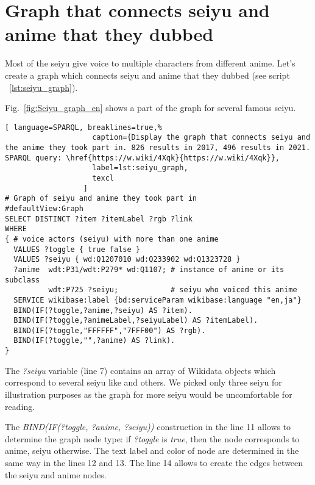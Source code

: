 \section{Graph that connects seiyu and anime that they dubbed}

Most of the seiyu give voice to multiple characters from different anime. Let's create a graph which connects seiyu and anime that they dubbed (see script ~\ref{lst:seiyu_graph}).

Fig.~\ref{fig:Seiyu_graph_en} shows a part of the graph for several famous seiyu.

\begin{widepar}%
\captionsetup[lstlisting]{format=llapwide18}%
%
\begin{lstlisting}[ language=SPARQL, breaklines=true,%
                    caption={Display the graph that connects seiyu and the anime they took part in. 826 results in 2017, 496 results in 2021. SPARQL query: \href{https://w.wiki/4Xqk}{https://w.wiki/4Xqk}},
                    label=lst:seiyu_graph,
                    texcl
                  ]
# Graph of seiyu and anime they took part in
#defaultView:Graph
SELECT DISTINCT ?item ?itemLabel ?rgb ?link
WHERE
{ # voice actors (seiyu) with more than one anime
  VALUES ?toggle { true false }
  VALUES ?seiyu { wd:Q1207010 wd:Q233902 wd:Q1323728 }
  ?anime  wdt:P31/wdt:P279* wd:Q1107; # instance of anime or its subclass
          wdt:P725 ?seiyu;            # seiyu who voiced this anime 
  SERVICE wikibase:label {bd:serviceParam wikibase:language "en,ja"}
  BIND(IF(?toggle,?anime,?seiyu) AS ?item).
  BIND(IF(?toggle,?animeLabel,?seiyuLabel) AS ?itemLabel).
  BIND(IF(?toggle,"FFFFFF","7FFF00") AS ?rgb).
  BIND(IF(?toggle,"",?anime) AS ?link).
}
\end{lstlisting}%
\end{widepar}%

The \emph{?seiyu} variable (line 7) contains an array of Wikidata objects which correspond to several seiyu like  and others. We picked only three seiyu for illustration purposes as the graph for more seiyu would be uncomfortable for reading.

The \emph{BIND(IF(?toggle, ?anime, ?seiyu))} construction in the line \num{11} allows to determine the graph node type: if \emph{?toggle} is \emph{true}, then the node corresponds to anime, seiyu otherwise. The text label and color of node are determined in the same way in the lines \num{12} and \num{13}. The line \num{14} allows to create the edges between the seiyu and anime nodes.

